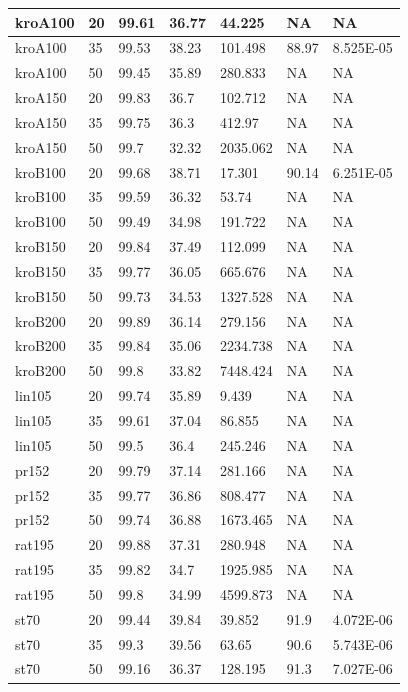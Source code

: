\begin{center}
\begin{longtable}{|l|l|l|l|l|l|l|}
\hline	kroA100	&	20	&	99.61	&	36.77	&	44.225	&	NA	&	NA	\\
\hline	kroA100	&	35	&	99.53	&	38.23	&	101.498	&	88.97	&	8.525E-05	\\
\hline	kroA100	&	50	&	99.45	&	35.89	&	280.833	&	NA	&	NA	\\
\hline	kroA150	&	20	&	99.83	&	36.7	&	102.712	&	NA	&	NA	\\
\hline	kroA150	&	35	&	99.75	&	36.3	&	412.97	&	NA	&	NA	\\
\hline	kroA150	&	50	&	99.7	&	32.32	&	2035.062	&	NA	&	NA	\\
\hline	kroB100	&	20	&	99.68	&	38.71	&	17.301	&	90.14	&	6.251E-05	\\
\hline	kroB100	&	35	&	99.59	&	36.32	&	53.74	&	NA	&	NA	\\
\hline	kroB100	&	50	&	99.49	&	34.98	&	191.722	&	NA	&	NA	\\
\hline	kroB150	&	20	&	99.84	&	37.49	&	112.099	&	NA	&	NA	\\
\hline	kroB150	&	35	&	99.77	&	36.05	&	665.676	&	NA	&	NA	\\
\hline	kroB150	&	50	&	99.73	&	34.53	&	1327.528	&	NA	&	NA	\\
\hline	kroB200	&	20	&	99.89	&	36.14	&	279.156	&	NA	&	NA	\\
\hline	kroB200	&	35	&	99.84	&	35.06	&	2234.738	&	NA	&	NA	\\
\hline	kroB200	&	50	&	99.8	&	33.82	&	7448.424	&	NA	&	NA	\\
\hline	lin105	&	20	&	99.74	&	35.89	&	9.439	&	NA	&	NA	\\
\hline	lin105	&	35	&	99.61	&	37.04	&	86.855	&	NA	&	NA	\\
\hline	lin105	&	50	&	99.5	&	36.4	&	245.246	&	NA	&	NA	\\
\hline	pr152	&	20	&	99.79	&	37.14	&	281.166	&	NA	&	NA	\\
\hline	pr152	&	35	&	99.77	&	36.86	&	808.477	&	NA	&	NA	\\
\hline	pr152	&	50	&	99.74	&	36.88	&	1673.465	&	NA	&	NA	\\
\hline	rat195	&	20	&	99.88	&	37.31	&	280.948	&	NA	&	NA	\\
\hline	rat195	&	35	&	99.82	&	34.7	&	1925.985	&	NA	&	NA	\\
\hline	rat195	&	50	&	99.8	&	34.99	&	4599.873	&	NA	&	NA	\\
\hline	st70	&	20	&	99.44	&	39.84	&	39.852	&	91.9	&	4.072E-06	\\
\hline	st70	&	35	&	99.3	&	39.56	&	63.65	&	90.6	&	5.743E-06	\\
\hline	st70	&	50	&	99.16	&	36.37	&	128.195	&	91.3	&	7.027E-06	\\

\end{longtable}
\end{center}
